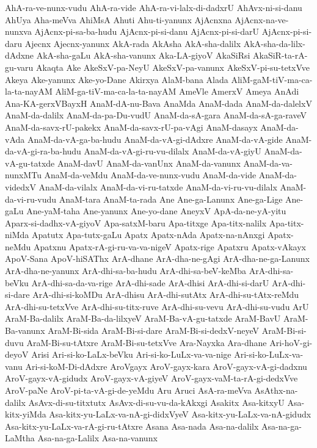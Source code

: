 {AhA-ra-ve-nunx-vudu
AhA-ra-vide
AhA-ra-vi-lalx-di-dadxrU
AhAvx-ni-si-danu
AhUya
Aha-meVva
AhiMsA
Ahuti
Ahu-ti-yanunx
AjAcnxna
AjAcnx-na-ve-nunxva
AjAcnx-pi-sa-ba-hudu
AjAcnx-pi-si-danu
AjAcnx-pi-si-darU
AjAcnx-pi-si-daru
Ajecnx
Ajecnx-yanunx
AkA-rada
AkAsha
AkA-sha-dalilx
AkA-sha-da-lilx-dAdxne
AkA-sha-gaLu
AkA-sha-vanunx
Aka-LA-giyoV
AkaSiRsi
AkaSiR-ta-rA-gu-varu
Akaqta
Ake
AkeSxV-pa-NeyU
AkeSxV-pa-vanunx
AkeSxV-pi-su-tetxVve
Akeya
Ake-yanunx
Ake-yo-Dane
Akirxya
AlaM-bana
Alada
AliM-gaM-tiV-ma-ca-la-ta-nayAM
AliM-ga-tiV-ma-ca-la-ta-nayAM
AmeVle
AmerxV
Ameya
AnAdi
Ana-KA-gerxVBayxH
AnaM-dA-nu-Bava
AnaMda
AnaM-dada
AnaM-da-dalelxV
AnaM-da-dalilx
AnaM-da-pa-Du-vudU
AnaM-da-sA-gara
AnaM-da-sA-ga-raveV
AnaM-da-savx-rU-pakekx
AnaM-da-savx-rU-pa-vAgi
AnaM-dasayx
AnaM-da-vAda
AnaM-da-vA-ga-ba-hudu
AnaM-da-vA-gi-dAdxre
AnaM-da-vA-gide
AnaM-da-vA-gi-ra-ba-hudu
AnaM-da-vA-gi-ru-vu-dilalx
AnaM-da-vA-giyU
AnaM-da-vA-gu-tatxde
AnaM-davU
AnaM-da-vanUnx
AnaM-da-vanunx
AnaM-da-va-nunxMTu
AnaM-da-veMdu
AnaM-da-ve-nunx-vudu
AnaM-da-vide
AnaM-da-videdxV
AnaM-da-vilalx
AnaM-da-vi-ru-tatxde
AnaM-da-vi-ru-vu-dilalx
AnaM-da-vi-ru-vudu
AnaM-tara
AnaM-ta-rada
Ane
Ane-ga-Lanunx
Ane-ga-Lige
Ane-gaLu
Ane-yaM-taha
Ane-yanunx
Ane-yo-dane
AneyxV
ApA-da-ne-yA-yitu
Aparx-si-dadhx-vA-giyoV
Apa-satxM-baru
Apa-titxge
Apa-titx-nalilx
Apa-titx-niMda
Apatutx
Apa-tutx-gaLu
Apatx
Apatx-nAda
Apatx-na-nAnxgi
Apatx-neMdu
Apatxnu
Apatx-rA-gi-ru-va-va-nigeV
Apatx-rige
Apatxru
Apatx-vAkayx
ApoV-Sana
ApoV-hiSAThx
ArA-dhane
ArA-dha-ne-gAgi
ArA-dha-ne-ga-Lanunx
ArA-dha-ne-yanunx
ArA-dhi-sa-ba-hudu
ArA-dhi-sa-beV-keMba
ArA-dhi-sa-beVku
ArA-dhi-sa-da-va-rige
ArA-dhi-sade
ArA-dhisi
ArA-dhi-si-darU
ArA-dhi-si-dare
ArA-dhi-si-koMDu
ArA-dhisu
ArA-dhi-sutAtx
ArA-dhi-su-tAtx-reMdu
ArA-dhi-su-tetxVve
ArA-dhi-su-titx-ruve
ArA-dhi-su-vevu
ArA-dhi-su-vudu
ArU
AraM-Ba-dalilx
AraM-Ba-da-lilxyeV
AraM-Ba-vA-gu-tatxde
AraM-BavU
AraM-Ba-vanunx
AraM-Bi-sida
AraM-Bi-si-dare
AraM-Bi-si-dedxV-neyeV
AraM-Bi-si-duvu
AraM-Bi-su-tAtxre
AraM-Bi-su-tetxVve
Ara-Nayxka
Ara-dhane
Ari-hoV-gi-deyoV
Arisi
Ari-si-ko-LaLx-beVku
Ari-si-ko-LuLx-va-va-nige
Ari-si-ko-LuLx-va-vanu
Ari-si-koM-Di-dAdxre
AroVgayx
AroV-gayx-kara
AroV-gayx-vA-gi-dadxnu
AroV-gayx-vA-gidudx
AroV-gayx-vA-giyeV
AroV-gayx-vaM-ta-rA-gi-dedxVve
AroV-paNe
AroV-pi-ta-vA-gi-de-yeMdu
Aru
Aruci
AsA-ra-meVva
AsAthx-na-dalilx
AsAvx-di-su-titxtutx
AsAvx-di-su-vu-da-kAkxgi
Asakitx
Asa-kitxyU
Asa-kitx-yiMda
Asa-kitx-yu-LaLx-va-nA-gi-didxVyeV
Asa-kitx-yu-LaLx-va-nA-gidudx
Asa-kitx-yu-LaLx-va-rA-gi-ru-tAtxre
Asana
Asa-nada
Asa-na-dalilx
Asa-na-ga-LaMtha
Asa-na-ga-Lalilx
Asa-na-vanunx
}
